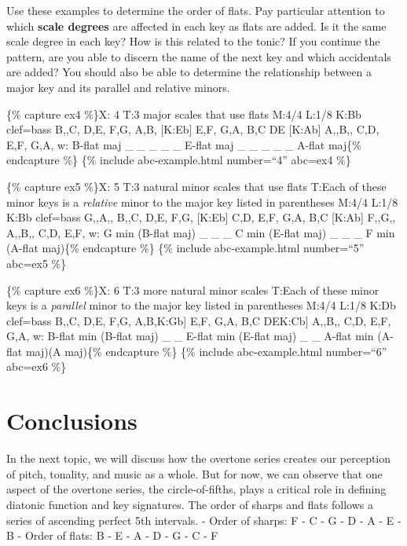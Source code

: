 \documentclass{book}
\begin{document}
Use these examples to determine the order of flats. Pay particular attention
to which \textbf{scale degrees} are affected in each key as flats are added.
Is it the same scale degree in each key? How is this related to the tonic? If
you continue the pattern, are you able to discern the name of the next key and
which accidentals are added? You should also be able to determine the
relationship between a major key and its parallel and relative minors.

\{\% capture ex4 \%\}X: 4 T:3 major scales that use flats M:4/4 L:1/8 K:Bb
clef=bass B,,C, D,E, F,G, A,B,\textbar\textbar{} {[}K:Eb{]} E,F, G,A, B,C
DE\textbar\textbar{} {[}K:Ab{]} A,,B,, C,D, E,F, G,A,\textbar{]} w: B-flat maj
\_ \_ \_ \_ \_ E-flat maj \_ \_ \_ \_ \_ A-flat maj\{\% endcapture \%\} \{\%
include abc-example.html number=``4'' abc=ex4 \%\}

\{\% capture ex5 \%\}X: 5 T:3 natural minor scales that use flats T:Each of
these minor keys is a \emph{relative} minor to the major key listed in
parentheses M:4/4 L:1/8 K:Bb clef=bass G,,A,, B,,C, D,E,
F,G,\textbar\textbar{} {[}K:Eb{]} C,D, E,F, G,A, B,C\textbar\textbar{}
{[}K:Ab{]} F,,G,, A,,B,, C,D, E,F,\textbar{]} w: G min (B-flat maj) \_ \_ \_ C
min (E-flat maj) \_ \_ \_ F min (A-flat maj)\{\% endcapture \%\} \{\% include
abc-example.html number=``5'' abc=ex5 \%\}

\{\% capture ex6 \%\}X: 6 T:3 more natural minor scales T:Each of these minor
keys is a \emph{parallel} minor to the major key listed in parentheses M:4/4
L:1/8 K:Db clef=bass B,,C, D,E, F,G, A,B,\textbar\textbar{[}K:Gb{]} E,F, G,A,
B,C DE\textbar\textbar{[}K:Cb{]} A,,B,, C,D, E,F, G,A,\textbar{]} w: B-flat
min (B-flat maj) \_ \_ E-flat min (E-flat maj) \_ \_ A-flat min (A-flat maj)(A
maj)\{\% endcapture \%\} \{\% include abc-example.html number=``6'' abc=ex6
\%\}

\hypertarget{conclusions-67}{%
\section{Conclusions}\label{conclusions-67}}

In the next topic, we will discuss how the overtone series creates our
perception of pitch, tonality, and music as a whole. But for now, we can
observe that one aspect of the overtone series, the circle-of-fifths, plays a
critical role in defining diatonic function and key signatures. The order of
sharps and flats follows a series of ascending perfect 5th intervals. - Order
of sharps: F - C - G - D - A - E - B - Order of flats: B - E - A - D - G - C -
F
\end{document}
